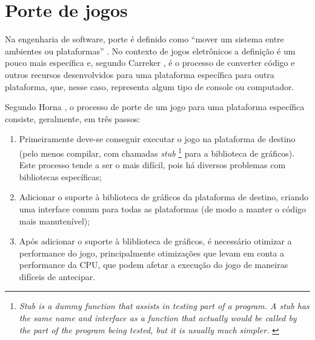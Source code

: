 \section{Porte de jogos}

Na engenharia de software, porte é definido como ``mover um sistema entre ambientes ou plataformas'' \cite{frakes}. No contexto de jogos eletrônicos a definição é um pouco mais específica e, segundo Carreker \cite{carreker}, é o processo de converter código e outros recursos desenvolvidos para uma plataforma específica para outra plataforma, que, nesse caso, representa algum tipo de console ou computador.

Segundo Horna \cite{wawro}, o processo de porte de um jogo para uma plataforma específica consiste, geralmente, em três passos:

\begin{enumerate}
  \item Primeiramente deve-se conseguir executar o jogo na plataforma de destino (pelo menos compilar, com chamadas \textit{stub} \footnote{\textit{Stub is a dummy function that assists in testing part of a program. A stub has the same name and interface as a function that actually would be called by the part of the program being tested, but it is usually much simpler.} \cite{dale}} para a biblioteca de gráficos). Este processo tende a ser o mais difícil, pois há diversos problemas com bibliotecas específicas;
  \item Adicionar o suporte à biblioteca de gráficos da plataforma de destino, criando uma interface comum para todas as plataformas (de modo a manter o código mais manutenível);
  \item Após adicionar o suporte à bliblioteca de gráficos, é necessário otimizar a performance do jogo, principalmente otimizações que levam em conta a performance da CPU, que podem afetar a execução do jogo de maneiras difíceis de antecipar.
\end{enumerate}


